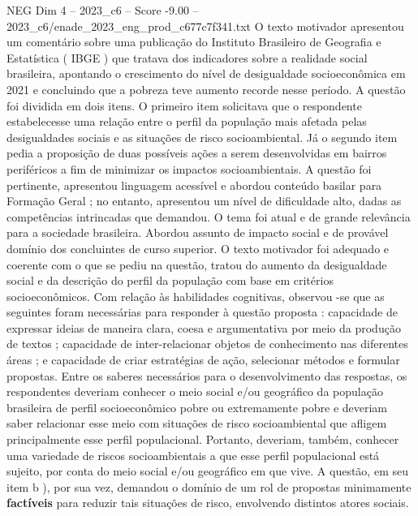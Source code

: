 \begin{textsample}{NEG Dim 4 – 2023\_c6 – Score -9.00 – 2023\_c6/enade\_2023\_eng\_prod\_c677c7f341.txt}
O texto motivador apresentou um comentário sobre uma publicação do Instituto Brasileiro de Geografia e Estatística ( IBGE ) que tratava dos indicadores sobre a realidade social brasileira, apontando o crescimento do nível de desigualdade socioeconômica em 2021 e concluindo que a pobreza teve aumento recorde nesse período.
A questão foi dividida em dois itens.
O primeiro item solicitava que o respondente estabelecesse uma relação entre o perfil da população mais afetada pelas desigualdades sociais e as situações de risco socioambiental.
Já o segundo item pedia a proposição de duas possíveis ações a serem desenvolvidas em bairros periféricos a fim de minimizar os impactos socioambientais.
A questão foi pertinente, apresentou linguagem acessível e abordou conteúdo basilar para Formação Geral ; no entanto, apresentou um nível de dificuldade alto, dadas as competências intrincadas que demandou.
O tema foi atual e de grande relevância para a sociedade brasileira.
Abordou assunto de impacto social e de provável domínio dos concluintes de curso superior.
O texto motivador foi adequado e coerente com o que se pediu na questão, tratou do aumento da desigualdade social e da descrição do perfil da população com base em critérios socioeconômicos.
Com relação às habilidades cognitivas, observou -se que as seguintes foram necessárias para responder à questão proposta : capacidade de expressar ideias de maneira clara, coesa e argumentativa por meio da produção de textos ; capacidade de inter-relacionar objetos de conhecimento nas diferentes áreas ; e capacidade de criar estratégias de ação, selecionar métodos e formular propostas.
Entre os saberes necessários para o desenvolvimento das respostas, os respondentes deveriam conhecer o meio social e/ou geográfico da população brasileira de perfil socioeconômico pobre ou extremamente pobre e deveriam saber relacionar esse meio com situações de risco socioambiental que afligem principalmente esse perfil populacional.
Portanto, deveriam, também, conhecer uma variedade de riscos socioambientais a que esse perfil populacional está sujeito, por conta do meio social e/ou geográfico em que vive.
A questão, em seu item b ), por sua vez, demandou o domínio de um rol de propostas minimamente \textbf{factíveis} para reduzir tais situações de risco, envolvendo distintos atores sociais.

\end{textsample}
